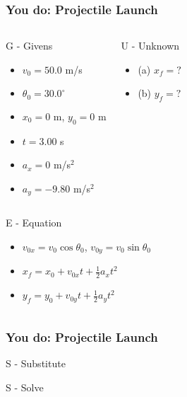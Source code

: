 \documentclass{beamer}
\begin{document}
\begin{frame}
\frametitle{You do: Projectile Launch}


\begin{columns}[T]
\begin{block}{G - Givens}
\begin{itemize}
\item $v_0 = 50.0$ m/s
\item $\theta_0 = 30.0^\circ$
\item $x_0 = 0$ m, $y_0 = 0$ m
\item $t = 3.00$ s
\item $a_x = 0$ m/s$^2$
\item $a_y = -9.80$ m/s$^2$
\end{itemize}
\end{block}
\pause
{}
\begin{block}{U - Unknown}
\begin{itemize}
\item (a) $x_f = ?$
\item (b) $y_f = ?$
\end{itemize}
\end{block}
\end{columns}
\pause
\begin{columns}[T]
\begin{block}{E - Equation}
\begin{itemize}
\item $v_{0x} = v_0 \cos\theta_0$, $v_{0y} = v_0 \sin\theta_0$
\item $x_f = x_0 + v_{0x}t + \frac{1}{2}a_x t^2$
\item $y_f = y_0 + v_{0y}t + \frac{1}{2}a_y t^2$
\end{itemize}
\end{block}
\end{columns}
\end{frame}

\begin{frame}
\frametitle{You do: Projectile Launch}
\begin{block}{S - Substitute}
\end{block}
\pause

\begin{block}{S - Solve}
\end{block}
\end{frame}
\end{document}
